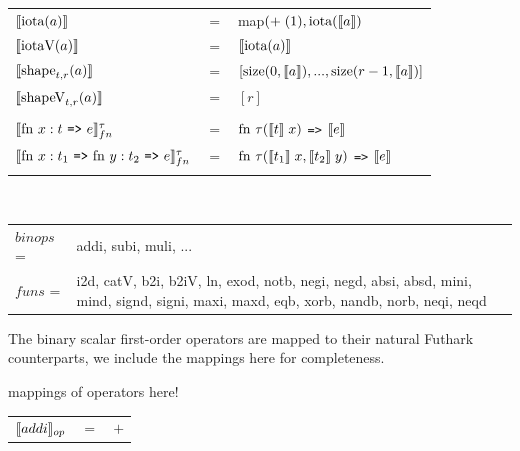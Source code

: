 \documentclass[11pt]{article}
\begin{document}
\begin{tabular}{l c l}

$\llbracket \text{iota}(a) \rrbracket$ & $=$ & map$(+ \; (1), \text{iota}(\llbracket a \rrbracket)$\\

$\llbracket \text{iotaV}(a) \rrbracket$ & $=$ & $\llbracket \text{iota}(a) \rrbracket$\\

$\llbracket \text{shape}_{t,r}(a) \rrbracket$ & $=$ & $[\text{size}(0,\llbracket a \rrbracket),...,\text{size}(r-1,\llbracket a \rrbracket)]$\\

$\llbracket \text{shapeV}_{t,r}(a) \rrbracket$ & $=$ & $[r]$\\
\\
%
%
$\evals{ \text{fn } x:t $ {\tt =>} $ e}^{\tau}_{fn} $ & $=$ & $ \text{fn } \tau (\llbracket t \rrbracket\; x) $ {\tt =>} $ \llbracket e \rrbracket$\\
$\evals{ \text{fn } x:t_1$ {\tt =>} $\text{fn } y:t_2 $ {\tt =>} $ e}^{\tau}_{fn} $ & $=$ & $ \text{fn } \tau (\llbracket t_1 \rrbracket\; x, \llbracket t_2 \rrbracket \; y) $ {\tt =>} $ \llbracket e \rrbracket$\\
\\
\end{tabular}\\

\begin{tabu} to \linewidth { l X}
$binops$ =& addi, subi, muli, ...\\
$funs$ =& i2d, catV, b2i, b2iV, ln, exod, notb, negi, negd, absi, absd, mini, mind, signd, signi, maxi, maxd, eqb, xorb,
nandb, norb, neqi, neqd
\end{tabu}

The binary scalar first-order operators are mapped to their natural Futhark counterparts, we include the mappings
here for completeness.

mappings of operators here!

\begin{tabular}{l c l}
$\llbracket addi \rrbracket_{op}$ & $=$ & $+$\\
\end{tabular}\\
\end{document}
